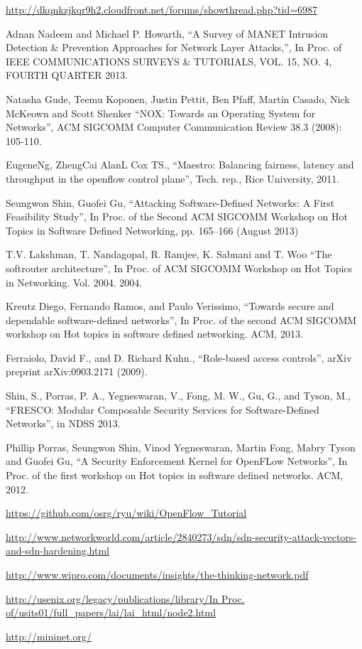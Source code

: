 \begin{thebibliography}{1}
\url{http://dkqnkzjkqr9h2.cloudfront.net/forums/showthread.php?tid=6987}










Adnan Nadeem and Michael P. Howarth,
``A Survey of MANET Intrusion Detection \& Prevention Approaches for Network Layer Attacks,'', In Proc. of IEEE COMMUNICATIONS SURVEYS \& TUTORIALS, VOL. 15, NO. 4, FOURTH QUARTER 2013.

Natasha Gude, Teemu Koponen, Justin Pettit, Ben Pfaff, Martín Casado, Nick McKeown and Scott Shenker
``NOX: Towards an Operating System for Networks'', ACM SIGCOMM Computer Communication Review 38.3 (2008): 105-110.

EugeneNg, ZhengCai AlanL Cox TS.,
``Maestro: Balancing fairness, latency and throughput in the openflow control plane'', Tech. rep., Rice University, 2011.

Seungwon Shin, Guofei Gu, 
``Attacking Software-Defined Networks: A First Feasibility Study'', In Proc. of the Second ACM SIGCOMM Workshop on Hot Topics in Software Defined Networking, pp. 165–166 (August 2013)

T.V. Lakshman, T. Nandagopal, R. Ramjee, K. Sabnani and T. Woo
``The softrouter architecture'', In Proc. of ACM SIGCOMM Workshop on Hot Topics in Networking. Vol. 2004. 2004.

Kreutz Diego, Fernando Ramos, and Paulo Verissimo, 
``Towards secure and dependable software-defined networks'', In Proc. of the second ACM SIGCOMM workshop on Hot topics in software defined networking. ACM, 2013.


Ferraiolo, David F., and D. Richard Kuhn., 
``Role-based access controls'', arXiv preprint arXiv:0903.2171 (2009).

Shin, S., Porras, P. A., Yegneswaran, V., Fong, M. W., Gu, G., and Tyson, M.,
``FRESCO: Modular Composable Security Services for Software-Defined Networks'', in NDSS 2013.

Phillip Porras, Seungwon Shin, Vinod Yegneswaran, Martin Fong, Mabry Tyson and Guofei Gu,
``A Security Enforcement Kernel for OpenFLow Networks'', In Proc. of the first workshop on Hot topics in software defined networks. ACM, 2012.


\url{https://github.com/osrg/ryu/wiki/OpenFlow_Tutorial}

\url{http://www.networkworld.com/article/2840273/sdn/sdn-security-attack-vectors-and-sdn-hardening.html}

\url{http://www.wipro.com/documents/insights/the-thinking-network.pdf}

\url{http://usenix.org/legacy/publications/library/In Proc. of/usits01/full_papers/lai/lai_html/node2.html}

\url{http://mininet.org/}

\end{thebibliography}